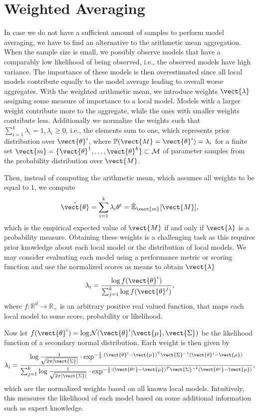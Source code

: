 \section{Weighted Averaging}
In case we do not have a sufficient amount of samples to perform model averaging, we have to find an alternative to the arithmetic mean aggregation. 
When the sample size is small, we possibly observe models that have a comparably low likelihood of being observed, i.e., the observed models have high variance. 
The importance of these models is then overestimated since all local models contribute equally to the model average leading to overall worse aggregates.
With the weighted arithmetic mean, we introduce weights $\vect{\lambda}$ assigning some measure of importance to a local model. 
Models with a larger weight contribute more to the aggregate, while the ones with smaller weights contribute less.
Additionally we normalize the weights such that $\sum_{i=1}^k \lambda_i = 1, \lambda_i \geq 0$, i.e., the elements sum to one, which represents prior distribution over $\vect{\theta}^i$, where $\mathbb{P}(\vect{M} = \vect{\theta}^i) = \lambda_i$ for a finite set $\vect{m} = \{\vect{\theta}^1, \ldots, \vect{\theta}^k\} \subset \mathcal{M}$ of parameter samples from the probability distribution over $\vect{M}$.

Then, instead of computing the arithmetic mean, which assumes all weights to be equal to $1$, we compute
\begin{equation}
     \hat{\vect{\theta}} = \sum_{i=1}^k \lambda_i \theta^i = \tilde{\mathbb{E}}_{\vect{m}}[\vect{M}],
\end{equation}
which is the empirical expected value of $\vect{M}$ if and only if $\vect{\lambda}$ is a probability measure.
Obtaining these weights is a challenging task as this requires prior knowledge about each local model or the distribution of local models.
We may consider evaluating each model using a performance metric or scoring function and use the normalized scores as means to obtain $\vect{\lambda}$
\begin{equation}
    \lambda_i = \frac{\log f(\vect{\theta}^i)}{\sum_{j=1}^k \log f(\vect{\theta}^j)},
\end{equation}
where $f: \mathbb{R}^d \rightarrow \mathbb{R}_+$ is an arbitrary positive real valued function, that maps each local model to some score, probability or likelihood.

Now let $f(\vect{\theta}^i) = \log \mathcal{N}(\vect{\theta}^i \lvert \vect{\mu}, \vect{\Sigma})$ be the likelihood function of a secondary normal distribution.
Each weight is then given by
\begin{equation}
    \label{eq:normll}
    \lambda_i = \frac{\log \frac{1}{\sqrt{2\pi\lvert \vect{\Sigma} \rvert}} \cdot \exp^{-\frac{1}{2} \cdot (\vect{\theta}^i - \vect{\mu})^T\vect{\Sigma}^{-1}(\vect{\theta}^i - \vect{\mu})}}{\sum_{j=1}^k \log \frac{1}{\sqrt{2\pi\lvert \vect{\Sigma} \rvert}} \cdot \exp^{-\frac{1}{2} \cdot (\vect{\theta^j} - \vect{\mu})^T\vect{\Sigma}^{-1}(\vect{\theta^j} - \vect{\mu})}},
\end{equation}
which are the normalized weights based on all known local models.
Intuitively, this measures the likelihood of each model based on some additional information such as expert knowledge.

